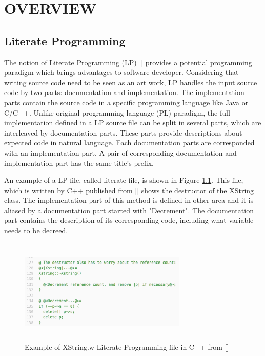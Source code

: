 \chapter{OVERVIEW}

\section{Literate Programming}

The notion of Literate  Programming (LP) [\cite{Knuth:1984:LP:473.479}] provides a potential programming paradigm which brings advantages to software developer. Considering that writing source code need to be seen as an art work, LP handles the input source code by two parts: documentation and implementation. The implementation parts contain the source code in a specific programming language like Java or C/C++. Unlike original programming language (PL) paradigm, the full implementation defined in a LP source file can be split in several parts, which are interleaved by documentation parts. These parts provide descriptions about expected code in natural language. Each documentation parts are corresponded with an implementation part.  A pair of corresponding documentation and implementation part has the same title's prefix.


An example of a LP file, called literate file, is shown in Figure \ref{fig:XStringLPExample}. This file, which is written by C++ published from [\cite{LPExample:XString}]  shows the destructor of the XString class. The implementation part of this method is defined in other area and it is aliased by a documentation part started with "Decrement". The documentation part contains the description of its corresponding code, including what variable needs to be decreed.

\begin{figure}[htp]
	\centering
	\includegraphics[width=8cm,height=5cm]{resources/fig_lp_file.png}%
	\caption[Example of XString.w Literate Programming file in C++]{Example of XString.w Literate Programming file in C++ from [\cite{LPExample:XString}]} 
	\label{fig:XStringLPExample}
\end{figure}

